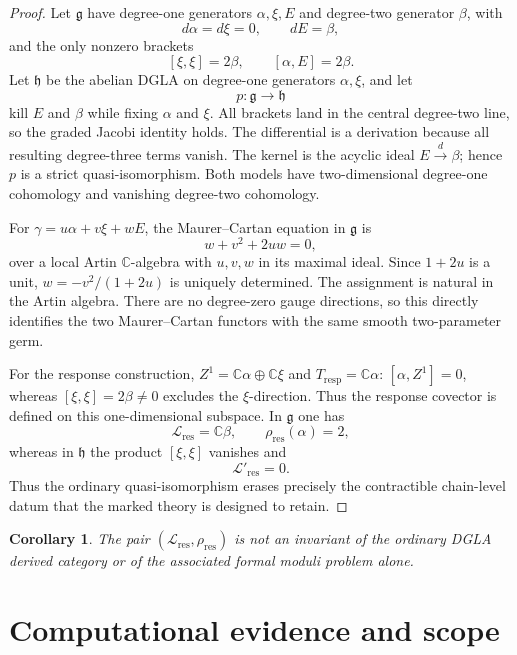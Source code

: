 \documentclass[11pt]{amsart}
\newtheorem{corollary}[theorem]{Corollary}
\newcommand{\C}{\mathbb C}
\begin{document}
\begin{proof}
Let \(\mathfrak g\) have degree-one generators \(\alpha,\xi,E\) and degree-two generator \(\beta\), with
\[
d\alpha=d\xi=0,
\qquad
dE=\beta,
\]
and the only nonzero brackets
\[
[\xi,\xi]=2\beta,
\qquad
[\alpha,E]=2\beta.
\]
Let \(\mathfrak h\) be the abelian DGLA on degree-one generators \(\alpha,\xi\), and let
\[
p:\mathfrak g\longrightarrow\mathfrak h
\]
kill \(E\) and \(\beta\) while fixing \(\alpha\) and \(\xi\).
All brackets land in the central degree-two line, so the graded Jacobi identity holds.
The differential is a derivation because all resulting degree-three terms vanish.
The kernel is the acyclic ideal \(E\xrightarrow{d}\beta\); hence \(p\) is a strict
quasi-isomorphism. Both models have two-dimensional degree-one cohomology and
vanishing degree-two cohomology.

For \(\gamma=u\alpha+v\xi+wE\), the Maurer--Cartan equation in \(\mathfrak g\) is
\[
w+v^2+2uw=0,
\]
over a local Artin \(\C\)-algebra with \(u,v,w\) in its maximal ideal.
Since \(1+2u\) is a unit, \(w=-v^2/(1+2u)\) is uniquely determined.
The assignment is natural in the Artin algebra. There are no degree-zero gauge
directions, so this directly identifies the two Maurer--Cartan functors with the
same smooth two-parameter germ.

For the response construction,
\(Z^1=\C\alpha\oplus\C\xi\) and \(T_{\mathrm{resp}}=\C\alpha\):
\([\alpha,Z^1]=0\), whereas \([\xi,\xi]=2\beta\ne0\) excludes the \(\xi\)-direction.
Thus the response covector is defined on this one-dimensional subspace.
In \(\mathfrak g\) one has
\[
\mathcal L_{\mathrm{res}}=\C\beta,
\qquad
\rho_{\mathrm{res}}(\alpha)=2,
\]
whereas in \(\mathfrak h\) the product \([\xi,\xi]\) vanishes and
\[
\mathcal L'_{\mathrm{res}}=0.
\]
Thus the ordinary quasi-isomorphism erases precisely the contractible chain-level datum that the marked theory is designed to retain.
\end{proof}

\begin{corollary}
The pair \((\mathcal L_{\mathrm{res}},\rho_{\mathrm{res}})\) is not an invariant of the ordinary DGLA derived category or of the associated formal moduli problem alone.
\end{corollary}

\section{Computational evidence and scope}\label{sec:verification}
\end{document}
